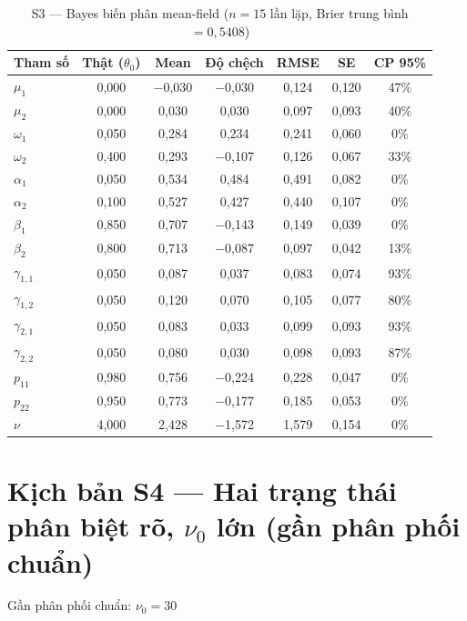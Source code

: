 \documentclass[11pt,a4paper]{article}
\begin{document}
\begin{table}[H]\centering\scriptsize
\caption{S3 --- Bayes biến phân mean-field ($n=15$ lần lặp, Brier trung bình $=0{,}5408$)}
\begin{tabularx}{\textwidth}{l C C C C C C}
\toprule
\textbf{Tham số} & \textbf{Thật ($\theta_0$)} & \textbf{Mean} & \textbf{Độ chệch} & \textbf{RMSE} & \textbf{SE} & \textbf{CP 95\%} \\
\midrule
$\mu_1$ & 0{,}000 & $-$0{,}030 & $-$0{,}030 & 0{,}124 & 0{,}120 & 47\% \\
$\mu_2$ & 0{,}000 & 0{,}030 & 0{,}030 & 0{,}097 & 0{,}093 & 40\% \\
$\omega_1$ & 0{,}050 & 0{,}284 & 0{,}234 & 0{,}241 & 0{,}060 & 0\% \\
$\omega_2$ & 0{,}400 & 0{,}293 & $-$0{,}107 & 0{,}126 & 0{,}067 & 33\% \\
$\alpha_1$ & 0{,}050 & 0{,}534 & 0{,}484 & 0{,}491 & 0{,}082 & 0\% \\
$\alpha_2$ & 0{,}100 & 0{,}527 & 0{,}427 & 0{,}440 & 0{,}107 & 0\% \\
$\beta_1$ & 0{,}850 & 0{,}707 & $-$0{,}143 & 0{,}149 & 0{,}039 & 0\% \\
$\beta_2$ & 0{,}800 & 0{,}713 & $-$0{,}087 & 0{,}097 & 0{,}042 & 13\% \\
$\gamma_{1,1}$ & 0{,}050 & 0{,}087 & 0{,}037 & 0{,}083 & 0{,}074 & 93\% \\
$\gamma_{1,2}$ & 0{,}050 & 0{,}120 & 0{,}070 & 0{,}105 & 0{,}077 & 80\% \\
$\gamma_{2,1}$ & 0{,}050 & 0{,}083 & 0{,}033 & 0{,}099 & 0{,}093 & 93\% \\
$\gamma_{2,2}$ & 0{,}050 & 0{,}080 & 0{,}030 & 0{,}098 & 0{,}093 & 87\% \\
$p_{11}$ & 0{,}980 & 0{,}756 & $-$0{,}224 & 0{,}228 & 0{,}047 & 0\% \\
$p_{22}$ & 0{,}950 & 0{,}773 & $-$0{,}177 & 0{,}185 & 0{,}053 & 0\% \\
$\nu$ & 4{,}000 & 2{,}428 & $-$1{,}572 & 1{,}579 & 0{,}154 & 0\% \\
\bottomrule
\end{tabularx}
\end{table}

\bigskip
\section*{Kịch bản S4 --- Hai trạng thái phân biệt rõ, $\nu_0$ lớn (gần phân phối chuẩn)}
Gần phân phối chuẩn: $\nu_0=30$
\end{document}
